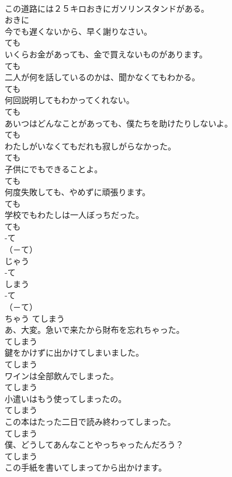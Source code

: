 \documentclass[8pt]{extreport}
\begin{document}
\begin{CJK}{UTF8}{min}
\\	この道路には２５キロおきにガソリンスタンドがある。	
\\	おきに
\\	今でも遅くないから、早く謝りなさい。	
\\	ても
\\	いくらお金があっても、金で買えないものがあります。	
\\	ても
\\	二人が何を話しているのかは、聞かなくてもわかる。	
\\	ても
\\	何回説明してもわかってくれない。	
\\	ても
\\	あいつはどんなことがあっても、僕たちを助けたりしないよ。	
\\	ても
\\	わたしがいなくてもだれも寂しがらなかった。	
\\	ても
\\	子供にでもできることよ。	
\\	ても
\\	何度失敗しても、やめずに頑張ります。	
\\	ても
\\	学校でもわたしは一人ぼっちだった。	
\\	ても
\\	-て
\\	（－て） 
\\	じゃう	
\\	-て
\\	しまう	
\\	-て
\\	（－て） 
\\	ちゃう	てしまう
\\	あ、大変。急いで来たから財布を忘れちゃった。	
\\	てしまう
\\	鍵をかけずに出かけてしまいました。	
\\	てしまう
\\	ワインは全部飲んでしまった。	
\\	てしまう
\\	小遣いはもう使ってしまったの。	
\\	てしまう
\\	この本はたった二日で読み終わってしまった。	
\\	てしまう
\\	僕、どうしてあんなことやっちゃったんだろう？	
\\	てしまう
\\	この手紙を書いてしまってから出かけます。	

\end{CJK}
\end{document}
